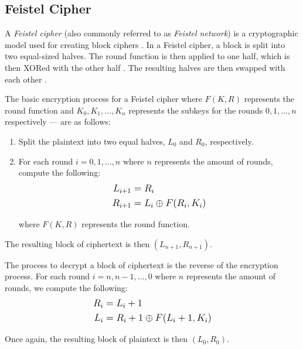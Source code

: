\subsection{Feistel Cipher}

A \textit{Feistel cipher} (also commonly referred to as \textit{Feistel network}) is a cryptographic model used for creating block ciphers \cite{wiki:feistel_cipher}.
In a Feistel cipher, a block is split into two equal-sized halves. The round function is then applied to one half, which is then XORed with the other half \cite{wiki:feistel_cipher}. 
The resulting halves are then swapped with each other \cite{wiki:feistel_cipher}.

The basic encryption process for a Feistel cipher where $F(K, R)$ represents the round function and $K_0,K_1,\ldots,K_n$ represents the subkeys for the rounds 
$0,1,\ldots,n$ respectively --- are as follows:

\begin{enumerate}
    \item Split the plaintext into two equal halves, $L_0$ and $R_0$, respectively.
    \item For each round $i = 0,1,\ldots,n$ where $n$ represents the amount of rounds, compute the following: 
        \begin{align*}
            \mathlarger{L_{i + 1}\;} & \mathlarger{= R_i} \\
            \mathlarger{R_{i + 1}\;} & \mathlarger{= L_i \oplus F(R_i,K_i)}
        \end{align*}
            
        where $F(K,R)$ represents the round function.
\end{enumerate}

The resulting block of ciphertext is then $(L_{n + 1},R_{n + 1})$.

The process to decrypt a block of ciphertext is the reverse of the encryption process. For each round $i = n,n-1,\ldots,0$ where $n$ represents the amount of rounds, 
we compute the following:
\begin{align*}
    \mathlarger{R_{i}\;} & \mathlarger{= L_i+1} \\
    \mathlarger{L_{i}\;} & \mathlarger{= R_i+1 \oplus F(L_i+1,K_i)}
\end{align*}

Once again, the resulting block of plaintext is then $(L_0,R_0)$.


